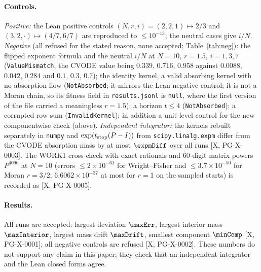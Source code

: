 \documentclass[11pt]{article}
\theoremstyle{remark}
\newcommand{\tier}[1]{\textsf{[#1]}}
\newcommand{\lean}[1]{\texttt{#1}}
\begin{document}
\paragraph{Controls.} \emph{Positive:} the Lean positive controls $(N,r,i)=(2,2,1)\mapsto2/3$ and $(3,2,\cdot)\mapsto(4/7,6/7)$ are reproduced to $\le10^{-13}$;
the neutral cases give $i/N$. \emph{Negative} (all refused for the stated reason, none accepted; Table~\ref{tab:neg}): the flipped exponent formula and the
neutral $i/N$ at $N=10$, $r=1.5$, $i=1,3,7$ (\lean{ValueMismatch}, the CVODE value being $0.339$, $0.716$, $0.958$ against $0.0088$, $0.042$, $0.284$ and $0.1$, $0.3$, $0.7$); the identity
kernel, a valid absorbing kernel with no absorption flow (\lean{NotAbsorbed}; it mirrors the Lean negative control; it is not a Moran chain, so its fitness field in \texttt{results.jsonl} is \texttt{null}, where the first version of the file carried a meaningless $r=1.5$); a horizon $t\le4$ (\lean{NotAbsorbed}); a corrupted row sum
(\lean{InvalidKernel}); in addition a unit-level control for the new componentwise check (above). \emph{Independent integrator:} the kernels rebuilt separately in \texttt{numpy} and $\exp(t_{\rm stop}(P-I))$ from \texttt{scipy.linalg.expm}
differ from the CVODE absorption mass by at most $\expmDiff$ over all runs \tier{X, PG-X-0003}. The WORK1 cross-check with exact rationals and 60-digit matrix powers
$P^{4096}$ at $N=10$ (errors $\le2\times10^{-61}$ for Wright--Fisher and $\le3.7\times10^{-50}$ for Moran $r=3/2$; $6.6062\times10^{-37}$ at most for $r=1$ on the sampled starts) is recorded as \tier{X, PG-X-0005}.

\begin{table}[ht]\centering\small
{}
\caption{Negative controls of the certificate: 9 of 9 refused.}\label{tab:neg}
\end{table}

\paragraph{Results.} All \nAcc{} runs are accepted: largest deviation $\maxErr$, largest interior mass $\maxInterior$, largest mass drift $\maxDrift$, smallest component $\minComp$ \tier{X, PG-X-0001};
all \nRef{} negative controls are refused \tier{X, PG-X-0002}. These numbers do not support any claim in this paper; they check that an independent integrator and the
Lean closed forms agree.
\end{document}
